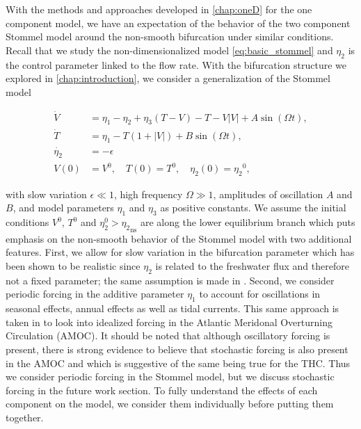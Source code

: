 With the methods and approaches developed in \autoref{chap:oneD} for the one component model, we have an expectation of the behavior of the two component Stommel model around the non-smooth bifurcation under similar conditions. Recall that we study the non-dimensionalized model \eqref{eq:basic_stommel} and $\eta_2$ is the control parameter linked to the flow rate. With the bifurcation structure we explored in \autoref{chap:introduction}, we consider a generalization of the Stommel model

\begin{equation}\label{eq:twoD_canonical}
  \begin{aligned}
   \dot{V} & =  \eta_1-\eta_2+\eta_3(T-V)-T-V|V|+A\sin(\Omega t), \\
   \dot{T}     & =  \eta_1-T(1+|V|)+B\sin(\Omega t),  \\
  \dot{\eta_2}  & =  -\epsilon\\
  V(0)&=V^0,\quad T(0)=T^0, \quad \eta_2(0)={\eta_2}^0,
  \end{aligned}
\end{equation}

with slow variation $\epsilon\ll 1$, high frequency $\Omega\gg 1$, amplitudes of oscillation $A$ and $B$, and model parameters $\eta_1$ and $\eta_3$ as positive constants. We assume the initial conditions $V^0$, $T^0$ and $\eta_2^0>{\eta_2}_{\text{ns}}$ are along the lower equilibrium branch which puts emphasis on the non-smooth behavior of the Stommel model with two additional features. First, we allow for slow variation in the bifurcation parameter which has been shown to be realistic since $\eta_2$ is related to the freshwater flux and therefore not a fixed parameter; the same assumption is made in \cite{roberts2017relaxation}. Second, we consider periodic forcing in the additive parameter $\eta_1$ to account for oscillations in seasonal effects, annual effects as well as tidal currents. This same approach is taken in \cite{park2012AMOCperiodic} to look into idealized forcing in the Atlantic Meridonal Overturning Circulation (AMOC). It should be noted that although oscillatory forcing is present, there is strong evidence to believe that stochastic forcing is also present in the AMOC \cite{caesar2018AMOC} and \cite{park2012AMOCperiodic} which is suggestive of the same being true for the THC. Thus we consider periodic forcing in the Stommel model, but we discuss stochastic forcing in the future work section. To fully understand the effects of each component on the model, we consider them individually before putting them together.

